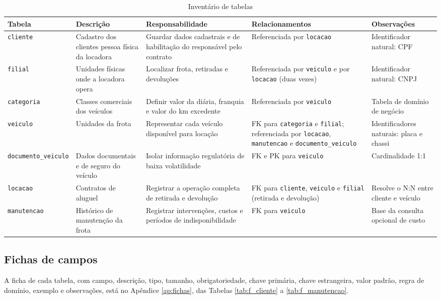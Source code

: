 \begin{table}[!t]
\caption{Invent\'ario de tabelas}
\label{tab:inventario}
\centering
\scriptsize
\setlength{\tabcolsep}{2.5pt}
\begin{tabular}{|L{2.9cm}|L{4.3cm}|L{3.5cm}|L{3.4cm}|L{2.5cm}|}
\hline
\textbf{Tabela} & \textbf{Descri\c{c}\~ao} & \textbf{Responsabilidade} & \textbf{Relacionamentos} & \textbf{Observa\c{c}\~oes} \\
\hline
\texttt{cliente} & Cadastro dos clientes pessoa f\'isica da locadora & Guardar dados cadastrais e de habilita\c{c}\~ao do respons\'avel pelo contrato & Referenciada por \texttt{locacao} & Identificador natural: CPF \\
\hline
\texttt{filial} & Unidades f\'isicas onde a locadora opera & Localizar frota, retiradas e devolu\c{c}\~oes & Referenciada por \texttt{veiculo} e por \texttt{locacao} (duas vezes) & Identificador natural: CNPJ \\
\hline
\texttt{categoria} & Classes comerciais dos ve\'iculos & Definir valor da di\'aria, franquia e valor do km excedente & Referenciada por \texttt{veiculo} & Tabela de dom\'inio de neg\'ocio \\
\hline
\texttt{veiculo} & Unidades da frota & Representar cada ve\'iculo dispon\'ivel para loca\c{c}\~ao & FK para \texttt{categoria} e \texttt{filial}; referenciada por \texttt{locacao}, \texttt{manutencao} e \texttt{documento\_veiculo} & Identificadores naturais: placa e chassi \\
\hline
\texttt{documento\_veiculo} & Dados documentais e de seguro do ve\'iculo & Isolar informa\c{c}\~ao regulat\'oria de baixa volatilidade & FK e PK para \texttt{veiculo} & Cardinalidade 1:1 \\
\hline
\texttt{locacao} & Contratos de aluguel & Registrar a opera\c{c}\~ao completa de retirada e devolu\c{c}\~ao & FK para \texttt{cliente}, \texttt{veiculo} e \texttt{filial} (retirada e devolu\c{c}\~ao) & Resolve o N:N entre cliente e ve\'iculo \\
\hline
\texttt{manutencao} & Hist\'orico de manuten\c{c}\~ao da frota & Registrar interven\c{c}\~oes, custos e per\'iodos de indisponibilidade & FK para \texttt{veiculo} & Base da consulta opcional de custo \\
\hline
\end{tabular}
\end{table}

\subsection{Fichas de campos}

A ficha de cada tabela, com campo, descri\c{c}\~ao, tipo, tamanho, obrigatoriedade, chave prim\'aria, chave estrangeira, valor padr\~ao, regra de dom\'inio, exemplo e observa\c{c}\~oes, est\'a no Ap\^endice \ref{ap:fichas}, das Tabelas \ref{tab:f_cliente} a \ref{tab:f_manutencao}.
